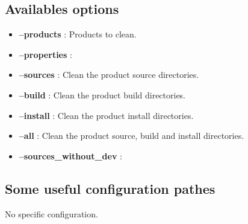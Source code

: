 \documentclass[a4paper,10pt,english]{sphinxmanual}
\begin{document}
\subsection{Availables options}
\label{commands/clean:availables-options}\begin{itemize}
\item {} 
\textbf{--products} : Products to clean.

\item {} 
\textbf{--properties} :


\item {} 
\textbf{--sources} : Clean the product source directories.

\item {} 
\textbf{--build} : Clean the product build directories.

\item {} 
\textbf{--install} : Clean the product install directories.

\item {} 
\textbf{--all} : Clean the product source, build and install directories.

\item {} 
\textbf{--sources\_without\_dev} :


\end{itemize}


\subsection{Some useful configuration pathes}
\label{commands/clean:some-useful-configuration-pathes}
No specific configuration.
\clearpage
\end{document}

